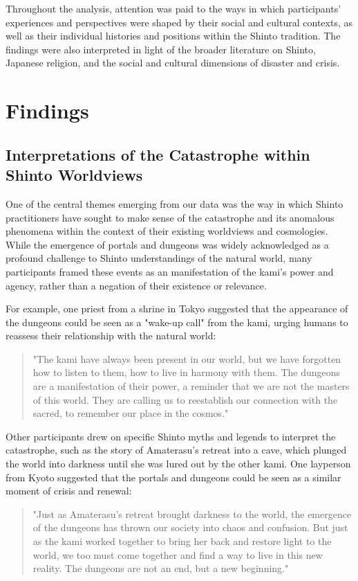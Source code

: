 \documentclass[12pt, a4paper]{article}
\begin{document}
Throughout the analysis, attention was paid to the ways in which participants' experiences and perspectives were shaped by their social and cultural contexts, as well as their individual histories and positions within the Shinto tradition. The findings were also interpreted in light of the broader literature on Shinto, Japanese religion, and the social and cultural dimensions of disaster and crisis.

\section{Findings}
\subsection{Interpretations of the Catastrophe within Shinto Worldviews}
One of the central themes emerging from our data was the way in which Shinto practitioners have sought to make sense of the catastrophe and its anomalous phenomena within the context of their existing worldviews and cosmologies. While the emergence of portals and dungeons was widely acknowledged as a profound challenge to Shinto understandings of the natural world, many participants framed these events as an manifestation of the kami's power and agency, rather than a negation of their existence or relevance.

For example, one priest from a shrine in Tokyo suggested that the appearance of the dungeons could be seen as a "wake-up call" from the kami, urging humans to reassess their relationship with the natural world:

\begin{quote}
"The kami have always been present in our world, but we have forgotten how to listen to them, how to live in harmony with them. The dungeons are a manifestation of their power, a reminder that we are not the masters of this world. They are calling us to reestablish our connection with the sacred, to remember our place in the cosmos."
\end{quote}

Other participants drew on specific Shinto myths and legends to interpret the catastrophe, such as the story of Amaterasu's retreat into a cave, which plunged the world into darkness until she was lured out by the other kami. One layperson from Kyoto suggested that the portals and dungeons could be seen as a similar moment of crisis and renewal:

\begin{quote}
"Just as Amaterasu's retreat brought darkness to the world, the emergence of the dungeons has thrown our society into chaos and confusion. But just as the kami worked together to bring her back and restore light to the world, we too must come together and find a way to live in this new reality. The dungeons are not an end, but a new beginning."
\end{quote}
\end{document}

